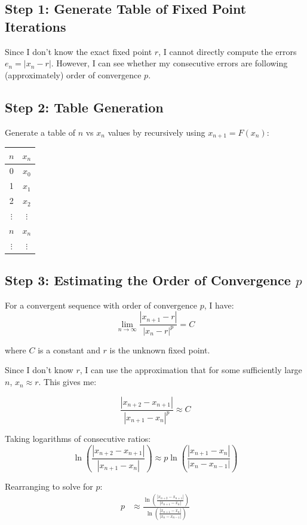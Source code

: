 \subsection*{Step 1: Generate Table of Fixed Point Iterations}

Since I don't know the exact fixed point $r$, I cannot directly compute the errors $e_n = |x_n - r|$. However, I can see whether my consecutive errors are following (approximately) order of convergence $p$.

\subsection*{Step 2: Table Generation}

Generate a table of $n$ vs $x_n$ values by recursively using $x_{n+1} = F(x_n)$:

\begin{center}
\begin{tabular}{|c|c|}
\hline
$n$ & $x_n$ \\
\hline
0 & $x_0$ \\
1 & $x_1$ \\
2 & $x_2$ \\
$\vdots$ & $\vdots$ \\
$n$ & $x_n$ \\
$\vdots$ & $\vdots$ \\
\hline
\end{tabular}
\end{center}

\subsection*{Step 3: Estimating the Order of Convergence $p$}

For a convergent sequence with order of convergence $p$, I have:
$$\lim_{n \to \infty} \frac{|x_{n+1} - r|}{|x_n - r|^p} = C$$

where $C$ is a constant and $r$ is the unknown fixed point.

Since I don't know $r$, I can use the approximation that for some sufficiently large $n$, $x_n \approx r$. This gives me:

$$\frac{|x_{n+2} - x_{n+1}|}{|x_{n+1} - x_n|^p} \approx C$$

Taking logarithms of consecutive ratios:
$$\ln\left(\frac{|x_{n+2} - x_{n+1}|}{|x_{n+1} - x_n|}\right) \approx p \ln\left(\frac{|x_{n+1} - x_n|}{|x_n - x_{n-1}|}\right)$$

Rearranging to solve for $p$:
\begin{align}
p &\approx \frac{\ln\left(\frac{|x_{n+2} - x_{n+1}|}{|x_{n+1} - x_n|}\right)}{\ln\left(\frac{|x_{n+1} - x_n|}{|x_n - x_{n-1}|}\right)} \label{eq:p-order-approximate}
\end{align}

